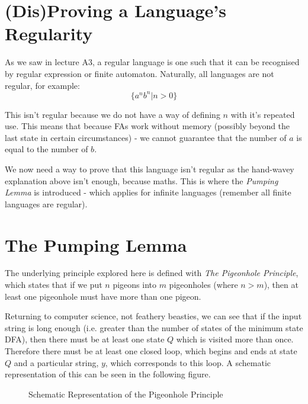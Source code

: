 \section{(Dis)Proving a Language's Regularity}
As we saw in lecture A3, a regular language is one such that it can be recognised by regular expression or finite automaton. Naturally, all languages are not regular, for example:
\[\{a^nb^n | n > 0\}\]

This isn't regular because we do not have a way of defining $n$ with it's repeated use. This means that because FAs work without memory (possibly beyond the last state in certain circumstances) - we cannot guarantee that the number of $a$ is equal to the number of $b$. 

We now need a way to prove that this language isn't regular as the hand-wavey explanation above isn't enough, because maths. This is where the \textit{Pumping Lemma} is introduced - which applies for infinite languages (remember all finite languages are regular). 

\section{The Pumping Lemma}
The underlying principle explored here is defined with \textit{The Pigeonhole Principle}, which states that if we put $n$ pigeons into $m$ pigeonholes (where $n>m$), then at least one pigeonhole must have more than one pigeon.

Returning to computer science, not feathery beasties, we can see that if the input string is long enough (i.e. greater than the number of states of the minimum state DFA), then there must be at least one state $Q$ which is visited more than once. Therefore there must be at least one closed loop, which begins and ends at state $Q$ and a particular string, $y$, which corresponds to this loop. A schematic representation of this can be seen in the following figure.

\begin{figure}[H]
    \centering
    \caption{Schematic Representation of the Pigeonhole Principle}
    \label{fig:reglang-pigeonholeprinciple}
\end{figure}

